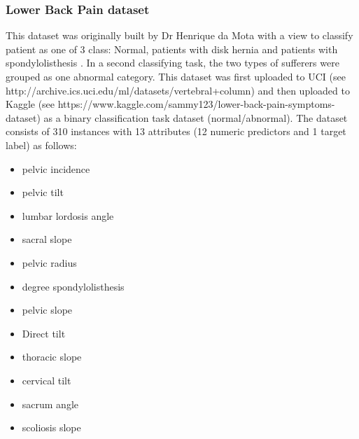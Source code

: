 \subsubsection{Lower Back Pain dataset}

This dataset was originally built by Dr Henrique da Mota with a view to classify patient as one of 3 class: Normal, patients with disk hernia and patients with spondylolisthesis \citep{RochaNeto:2009wp}. In a second classifying task, the two types of sufferers were grouped as one abnormal category. This dataset was first uploaded to UCI (see http://archive.ics.uci.edu/ml/datasets/vertebral+column) and then uploaded to Kaggle (see https://www.kaggle.com/sammy123/lower-back-pain-symptoms-dataset) as a binary classification task dataset (normal/abnormal).\newline
The dataset consists of 310 instances with 13 attributes (12 numeric predictors and 1 target label) as follows:
\begin{itemize}
    \item pelvic incidence
    \item pelvic tilt
    \item lumbar lordosis angle
    \item sacral slope
    \item pelvic radius
    \item degree spondylolisthesis
    \item pelvic slope
    \item Direct tilt
    \item thoracic slope
    \item cervical tilt
    \item sacrum angle
    \item scoliosis slope
\end{itemize}

